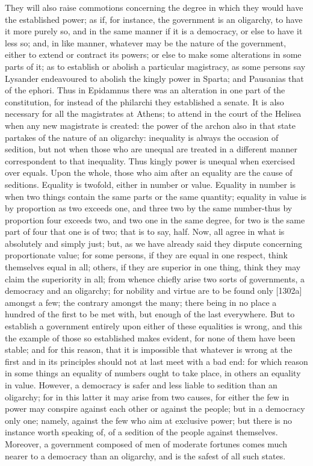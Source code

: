 They will also raise commotions concerning the degree in which they would
have the established power; as if, for instance, the government is an
oligarchy, to have it more purely so, and in the same manner if it is a
democracy, or else to have it less so; and, in like manner, whatever may
be the nature of the government, either to extend or contract its powers;
or else to make some alterations in some parts of it; as to establish or
abolish a particular magistracy, as some persons say Lysander endeavoured
to abolish the kingly power in Sparta; and Pausanias that of the ephori.
Thus in Epidamnus there was an alteration in one part of the constitution,
for instead of the philarchi they established a senate. It is also
necessary for all the magistrates at Athens; to attend in the court of the
Helisea when any new magistrate is created: the power of the archon also
in that state partakes of the nature of an oligarchy: inequality is always
the occasion of sedition, but not when those who are unequal are treated
in a different manner correspondent to that inequality. Thus kingly power
is unequal when exercised over equals. Upon the whole, those who aim after
an equality are the cause of seditions. Equality is twofold, either in
number or value. Equality in number is when two things contain the same
parts or the same quantity; equality in value is by proportion as two
exceeds one, and three two by the same number-thus by proportion four
exceeds two, and two one in the same degree, for two is the same part of
four that one is of two; that is to say, half. Now, all agree in what is
absolutely and simply just; but, as we have already said they dispute
concerning proportionate value; for some persons, if they are equal in one
respect, think themselves equal in all; others, if they are superior in
one thing, think they may claim the superiority in all; from whence
chiefly arise two sorts of governments, a democracy and an oligarchy; for
nobility and virtue are to be found only [1302a] amongst a few; the
contrary amongst the many; there being in no place a hundred of the first
to be met with, but enough of the last everywhere. But to establish a
government entirely upon either of these equalities is wrong, and this the
example of those so established makes evident, for none of them have been
stable; and for this reason, that it is impossible that whatever is wrong
at the first and in its principles should not at last meet with a bad end:
for which reason in some things an equality of numbers ought to take
place, in others an equality in value. However, a democracy is safer and
less liable to sedition than an oligarchy; for in this latter it may arise
from two causes, for either the few in power may conspire against each
other or against the people; but in a democracy only one; namely, against
the few who aim at exclusive power; but there is no instance worth
speaking of, of a sedition of the people against themselves. Moreover, a
government composed of men of moderate fortunes comes much nearer to a
democracy than an oligarchy, and is the safest of all such states.

